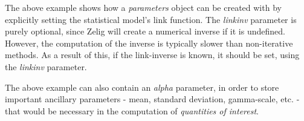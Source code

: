 The above example shows how a \emph{parameters} object can be created with by explicitly setting the statistical model's link function.  The \emph{linkinv} parameter is purely optional, since Zelig will create a numerical inverse if it is undefined.  However, the computation of the inverse is typically slower than non-iterative methods.  As a result of this, if the link-inverse is known, it should be set, using the \emph{linkinv} parameter.

The above example can also contain an \emph{alpha} parameter, in order to store important ancillary parameters - mean, standard deviation, gamma-scale, etc. - that would be necessary in the computation of \emph{quantities of interest}.


